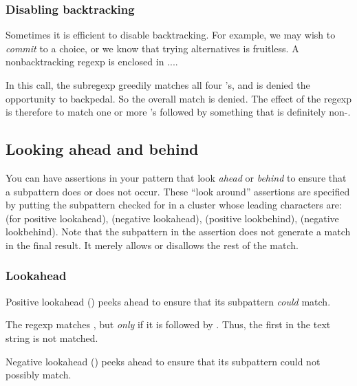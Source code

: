 {\subsubsection{Disabling backtracking}

Sometimes it is efficient to disable backtracking.  For
example, we may wish  to  {\em commit} to a choice, or
we know that trying alternatives is fruitless.  A
nonbacktracking regexp is enclosed in ...\p{)}.


In this call, the subregexp  greedily matches
all four 's, and is denied the opportunity to
backpedal.  So the overall match is denied.  The effect
of the regexp is therefore to match one or more 's
followed by something that is definitely non-.

\subsection{Looking ahead and behind}

You can have assertions in your pattern that look {\em
ahead} or {\em behind} to ensure that a subpattern does
or does not occur.   These ``look around'' assertions are
specified by putting the subpattern checked for in a
cluster whose leading characters are:  (for positive
lookahead),  (negative lookahead), 
(positive lookbehind),  (negative lookbehind).
Note that the subpattern in the assertion  does not
generate a match in the final result.  It merely allows
or disallows the rest of the match.

\subsubsection{Lookahead}

Positive lookahead () peeks ahead to ensure that
its subpattern {\em could} match.  


\n The regexp  matches , but
{\em only} if it is followed by .  Thus, the first
 in the text string is not matched. 

Negative lookahead () peeks ahead
to ensure that its subpattern could not possibly match.  


}
